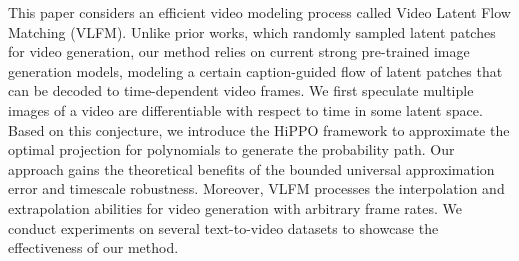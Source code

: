 This paper considers an efficient video modeling process called Video Latent Flow Matching (VLFM). Unlike prior works, which randomly sampled latent patches for video generation, our method relies on current strong pre-trained image generation models, modeling a certain caption-guided flow of latent patches that can be decoded to time-dependent video frames. 
We first speculate multiple images of a video are differentiable with respect to time in some latent space. Based on this conjecture, we introduce the HiPPO framework to approximate the optimal projection for polynomials to generate the probability path. Our approach gains the theoretical benefits of the bounded universal approximation error and timescale robustness. Moreover, VLFM processes the interpolation and extrapolation abilities for video generation with arbitrary frame rates. We conduct experiments on several text-to-video datasets to showcase the effectiveness of our method.